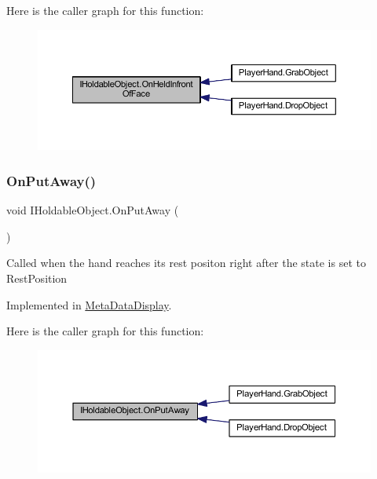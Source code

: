 Here is the caller graph for this function\+:
\nopagebreak
\begin{figure}[H]
\begin{center}
\leavevmode
\includegraphics[width=350pt]{interface_i_holdable_object_a6f63fec8fb8f715ad5cdd08aa5ec0ea5_icgraph}
\end{center}
\end{figure}
\mbox{\label{interface_i_holdable_object_abe7c5e5ed97fb5c908c91da5b8714f0e}} 
\subsubsection{\texorpdfstring{On\+Put\+Away()}{OnPutAway()}}
{\footnotesize\ttfamily void I\+Holdable\+Object.\+On\+Put\+Away (\begin{DoxyParamCaption}{ }\end{DoxyParamCaption})}



Called when the hand reaches it\textquotesingle{}s rest positon right after the state is set to Rest\+Position 



Implemented in \mbox{\hyperlink{class_meta_data_display_a55888c6c3e3e224d89d95b6c63652762}{Meta\+Data\+Display}}.

Here is the caller graph for this function\+:
\nopagebreak
\begin{figure}[H]
\begin{center}
\leavevmode
\includegraphics[width=350pt]{interface_i_holdable_object_abe7c5e5ed97fb5c908c91da5b8714f0e_icgraph}
\end{center}
\end{figure}
\mbox{\label{interface_i_holdable_object_a75f802a9736db51e5e8d1568689dd11c}} 
